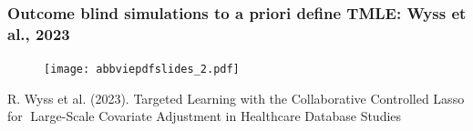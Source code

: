 \documentclass[t]{beamer}
\begin{document}

\begin{frame}\frametitle{Outcome blind simulations to a priori define TMLE: Wyss et al., 2023}


\centering
\begin{figure}
\begin{center}
\texttt{[image: abbviepdfslides\_2.pdf]}
\end{center}
\end{figure}
{\small R. Wyss et al. (2023). Targeted Learning with the Collaborative Controlled Lasso for Large-Scale Covariate Adjustment in Healthcare Database Studies}



\end{frame}
\end{document}
